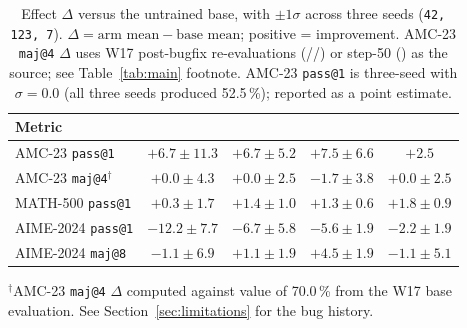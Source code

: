 \begin{table}[t]
\centering\small
\caption{Effect $\Delta$ versus the untrained base, with $\pm 1\sigma$ across
three seeds (\texttt{42, 123, 7}).
$\Delta = \text{arm mean} - \text{base mean}$; positive = improvement.
AMC-23 \texttt{maj@4} $\Delta$ uses W17 post-bugfix re-evaluations
(\armA{}/\armB{}/\armC{}) or step-50 (\armD{}) as the source; see
Table~\ref{tab:main} footnote. \armD{} AMC-23 \texttt{pass@1} is
three-seed with $\sigma=0.0$ (all three seeds produced 52.5\,\%);
reported as a point estimate.}
\label{tab:delta}
\begin{tabular}{lcccc}
\toprule
Metric & \armA{} & \armB{} & \armC{} & \armD{} \\
\midrule
AMC-23 \texttt{pass@1}      & $+6.7\pm 11.3$ & $+6.7\pm 5.2$ & $+7.5\pm 6.6$ & $+2.5$ \\
AMC-23 \texttt{maj@4}$^\dagger$ & $+0.0\pm 4.3$ & $+0.0\pm 2.5$ & $-1.7\pm 3.8$ & $+0.0\pm 2.5$ \\
MATH-500 \texttt{pass@1}    & $+0.3\pm 1.7$  & $+1.4\pm 1.0$ & $+1.3\pm 0.6$ & $+1.8\pm 0.9$ \\
AIME-2024 \texttt{pass@1}   & $-12.2\pm 7.7$ & $-6.7\pm 5.8$ & $-5.6\pm 1.9$ & $-2.2\pm 1.9$ \\
AIME-2024 \texttt{maj@8}    & $-1.1\pm 6.9$  & $+1.1\pm 1.9$ & $+4.5\pm 1.9$ & $-1.1\pm 5.1$ \\
\bottomrule
\end{tabular}

\medskip
\noindent\small
$^\dagger$AMC-23 \texttt{maj@4} $\Delta$ computed against \base{} value
of 70.0\,\% from the W17 base evaluation. See
Section~\ref{sec:limitations} for the bug history.
\end{table}
